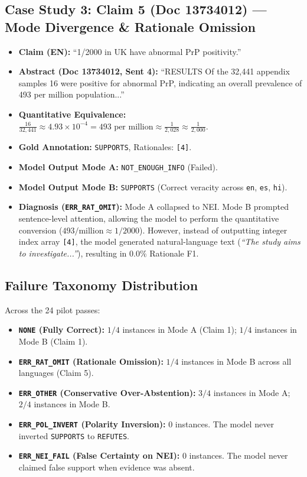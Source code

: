 \documentclass[10pt,twocolumn]{article}
\begin{document}
\subsection{Case Study 3: Claim 5 (Doc 13734012) — Mode Divergence & Rationale Omission}
\begin{itemize}
    \item \textbf{Claim (EN):} ``1/2000 in UK have abnormal PrP positivity.''
    \item \textbf{Abstract (Doc 13734012, Sent 4):} ``RESULTS Of the 32,441 appendix samples 16 were positive for abnormal PrP, indicating an overall prevalence of 493 per million population...''
    \item \textbf{Quantitative Equivalence:} $\frac{16}{32,441} \approx 4.93 \times 10^{-4} = 493 \text{ per million} \approx \frac{1}{2,028} \approx \frac{1}{2,000}$.
    \item \textbf{Gold Annotation:} \texttt{SUPPORTS}, Rationales: \texttt{[4]}.
    \item \textbf{Model Output Mode A:} \texttt{NOT\_ENOUGH\_INFO} (Failed).
    \item \textbf{Model Output Mode B:} \texttt{SUPPORTS} (Correct veracity across \texttt{en}, \texttt{es}, \texttt{hi}).
    \item \textbf{Diagnosis (\texttt{ERR_RAT_OMIT}):} Mode A collapsed to NEI. Mode B prompted sentence-level attention, allowing the model to perform the quantitative conversion ($493/\text{million} \approx 1/2000$). However, instead of outputting integer index array \texttt{[4]}, the model generated natural-language text (\textit{``The study aims to investigate...''}), resulting in $0.0\%$ Rationale F1.
\end{itemize}

\subsection{Failure Taxonomy Distribution}
Across the 24 pilot passes:
\begin{itemize}
    \item \textbf{\texttt{NONE} (Fully Correct):} $1/4$ instances in Mode A (Claim 1); $1/4$ instances in Mode B (Claim 1).
    \item \textbf{\texttt{ERR_RAT_OMIT} (Rationale Omission):} $1/4$ instances in Mode B across all languages (Claim 5).
    \item \textbf{\texttt{ERR_OTHER} (Conservative Over-Abstention):} $3/4$ instances in Mode A; $2/4$ instances in Mode B.
    \item \textbf{\texttt{ERR_POL_INVERT} (Polarity Inversion):} $0$ instances. The model never inverted \texttt{SUPPORTS} to \texttt{REFUTES}.
    \item \textbf{\texttt{ERR_NEI_FAIL} (False Certainty on NEI):} $0$ instances. The model never claimed false support when evidence was absent.
\end{itemize}
\end{document}
